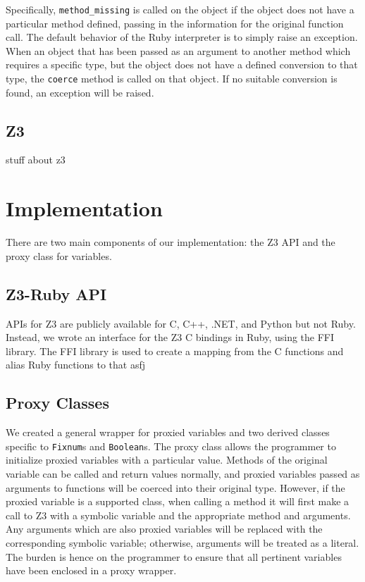 \documentclass[10pt]{article}
\begin{document}
Specifically, \texttt{method\_missing} is called on the object if the object does not have a particular method defined, passing in the information for the original function call.  The default behavior of the Ruby interpreter is to simply raise an exception.\\

When an object that has been passed as an argument to another method which requires a specific type, but the object does not have a defined conversion to that type, the \texttt{coerce} method is called on that object.  If no suitable conversion is found, an exception will be raised.\\

\subsection{Z3}
stuff about z3

\section{Implementation}
There are two main components of our implementation: the Z3 API and the proxy class for variables.\\

\subsection{Z3-Ruby API}
APIs for Z3 are publicly available for C, C++, .NET, and Python \textemdash but not Ruby.  Instead, we wrote an interface for the Z3 C bindings in Ruby, using the FFI library.  The FFI library is used to create a mapping from the C functions and alias Ruby functions to that asfj

\subsection{Proxy Classes}
We created a general wrapper for proxied variables and two derived classes specific to \texttt{Fixnum}s and \texttt{Boolean}s.  The proxy class allows the programmer to initialize proxied variables with a particular value.  Methods of the original variable can be called and return values normally, and proxied variables passed as arguments to functions will be coerced into their original type.  However, if the proxied variable is a supported class, when calling a method it will first make a call to Z3 with a symbolic variable and the appropriate method and arguments.  Any arguments which are also proxied variables will be replaced with the corresponding symbolic variable; otherwise, arguments will be treated as a literal.  The burden is hence on the programmer to ensure that all pertinent variables have been enclosed in a proxy wrapper.\\
\end{document}
